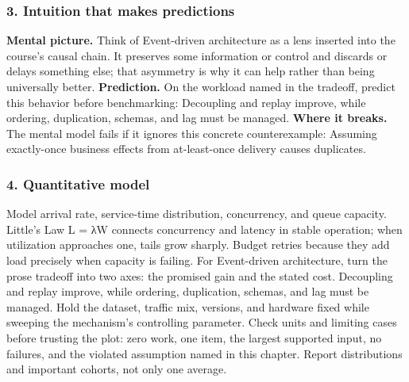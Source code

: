 \subsubsection*{3. Intuition that makes predictions}
\textbf{Mental picture.} Think of Event-driven architecture as a lens inserted into the course's causal chain. It preserves some information or control and discards or delays something else; that asymmetry is why it can help rather than being universally better.
\textbf{Prediction.} On the workload named in the tradeoff, predict this behavior before benchmarking: Decoupling and replay improve, while ordering, duplication, schemas, and lag must be managed.
\textbf{Where it breaks.} The mental model fails if it ignores this concrete counterexample: Assuming exactly-once business effects from at-least-once delivery causes duplicates.
\subsubsection*{4. Quantitative model}
Model arrival rate, service-time distribution, concurrency, and queue capacity. Little's Law L = λW connects concurrency and latency in stable operation; when utilization approaches one, tails grow sharply. Budget retries because they add load precisely when capacity is failing.
For Event-driven architecture, turn the prose tradeoff into two axes: the promised gain and the stated cost. Decoupling and replay improve, while ordering, duplication, schemas, and lag must be managed. Hold the dataset, traffic mix, versions, and hardware fixed while sweeping the mechanism's controlling parameter.
Check units and limiting cases before trusting the plot: zero work, one item, the largest supported input, no failures, and the violated assumption named in this chapter. Report distributions and important cohorts, not only one average.
